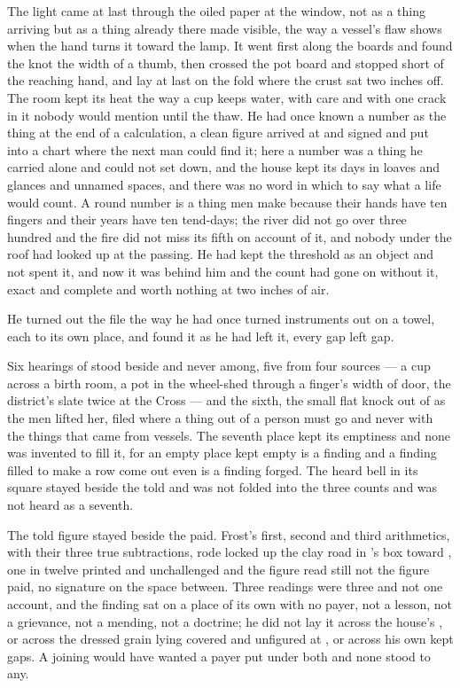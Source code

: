 The light came at last through the oiled paper at the window, not as a thing arriving but as a thing already there made visible, the way a vessel's flaw shows when the hand turns it toward the lamp. It went first along the boards and found the knot the width of a thumb, then crossed the pot board and stopped short of the reaching hand, and lay at last on the fold where the crust sat two inches off. The room kept its heat the way a cup keeps water, with care and with one crack in it nobody would mention until the thaw. He had once known a number as the thing at the end of a calculation, a clean figure arrived at and signed and put into a chart where the next man could find it; here a number was a thing he carried alone and could not set down, and the house kept its days in loaves and glances and unnamed spaces, and there was no  word in which to say what a life would count. A round number is a thing men make because their hands have ten fingers and their years have ten tend-days; the river did not go over three hundred and the fire did not miss its fifth on account of it, and nobody under the roof had looked up at the passing. He had kept the threshold as an object and not spent it, and now it was behind him and the count had gone on without it, exact and complete and worth nothing at two inches of air.

\scenebreak

He turned out the file the way he had once turned instruments out on a towel, each to its own place, and found it as he had left it, every gap left gap.

Six hearings of  stood beside and never among, five from four sources --- a cup across a birth room, a pot in the wheel-shed through a finger's width of door, the district's slate twice at the Cross --- and the sixth, the small flat knock out of  as the men lifted her, filed where a thing out of a person must go and never with the things that came from vessels. The seventh place kept its emptiness and none was invented to fill it, for an empty place kept empty is a finding and a finding filled to make a row come out even is a finding forged. The heard bell in its square stayed beside the told and was not folded into the three counts and was not heard as a seventh.

The told figure stayed beside the paid. Frost's first, second and third arithmetics, with their three true subtractions, rode locked up the clay road in 's box toward , one in twelve printed and unchallenged and the figure read still not the figure paid, no signature on the space between. Three readings were three and not one account, and the finding sat on a place of its own with no payer, not a lesson, not a grievance, not a mending, not a doctrine; he did not lay it across the house's , or across the dressed grain lying covered and unfigured at , or across his own kept gaps. A joining would have wanted a payer put under both and none stood to any.

